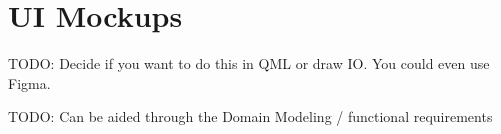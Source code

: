 \section{UI Mockups}

TODO: Decide if you want to do this in QML or draw IO. You could even use Figma.

TODO: Can be aided through the Domain Modeling / functional requirements